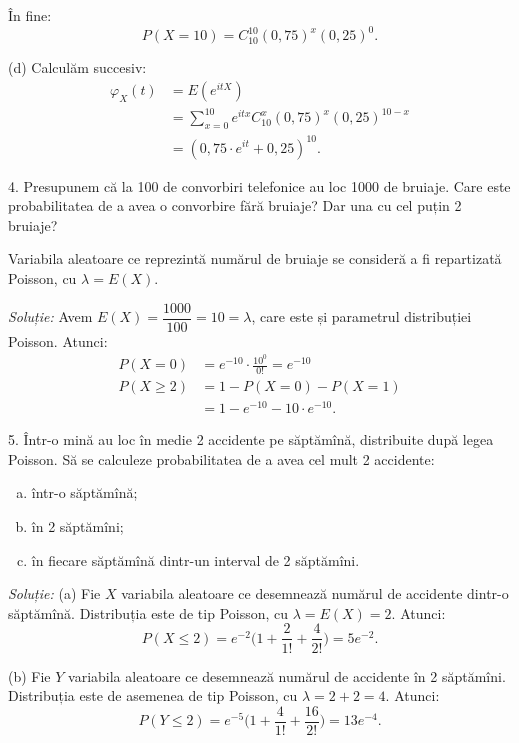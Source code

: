 \documentclass[12pt,a4paper]{article}
\theoremstyle{dotless}
\theoremstyle{dotlessdr}
\begin{document}
În fine:
\[
  P(X = 10) = C_{10}^{10} (0,75)^x (0,25)^0.
\]

(d) Calculăm succesiv:
\begin{align*}
  \varphi_X(t) &= E(e^{itX}) \\
               &= \sum_{x = 0}^{10} e^{itx} C_{10}^x (0,75)^x (0,25)^{10-x} \\
               &= (0,75 \cdot e^{it} + 0,25)^{10}.
\end{align*}

\vspace{1cm}

4. Presupunem că la 100 de convorbiri telefonice au loc 1000 de bruiaje.
Care este probabilitatea de a avea o convorbire fără bruiaje? Dar una
cu cel puțin 2 bruiaje?

Variabila aleatoare ce reprezintă numărul de bruiaje se consideră a fi
repartizată Poisson, cu $ \lambda = E(X) $.

\emph{Soluție:} Avem $ E(X) = \dfrac{1000}{100} = 10 = \lambda $, care este
și parametrul distribuției Poisson. Atunci:
\begin{align*}
  P(X = 0) &= e^{-10} \cdot \frac{10^0}{0!} = e^{-10} \\
  P(X \geq 2) &= 1 - P(X = 0) - P(X = 1) \\
           &= 1 - e^{-10} - 10 \cdot e^{-10}.
\end{align*}

\vspace{1cm}

5. Într-o mină au loc în medie 2 accidente pe săptămînă, distribuite după legea
Poisson. Să se calculeze probabilitatea de a avea cel mult 2 accidente:
\begin{enumerate}[(a)]
\item într-o săptămînă;
\item în 2 săptămîni;
\item în fiecare săptămînă dintr-un interval de 2 săptămîni.
\end{enumerate}

\emph{Soluție:} (a) Fie $ X $ variabila aleatoare ce desemnează numărul de accidente
dintr-o săptămînă. Distribuția este de tip Poisson, cu $ \lambda = E(X) = 2 $.
Atunci:
\[
  P(X \leq 2) = e^{-2} \Big( 1 + \frac{2}{1!} + \dfrac{4}{2!} \Big) = 5e^{-2}.
\]

(b) Fie $ Y $ variabila aleatoare ce desemnează numărul de accidente în 2 săptămîni.
Distribuția este de asemenea de tip Poisson, cu $ \lambda = 2 + 2 = 4 $. Atunci:
\[
  P(Y \leq 2) = e^{-5} \Big( 1 + \frac{4}{1!} + \frac{16}{2!} \Big) = 13e^{-4}.
\]
\end{document}
